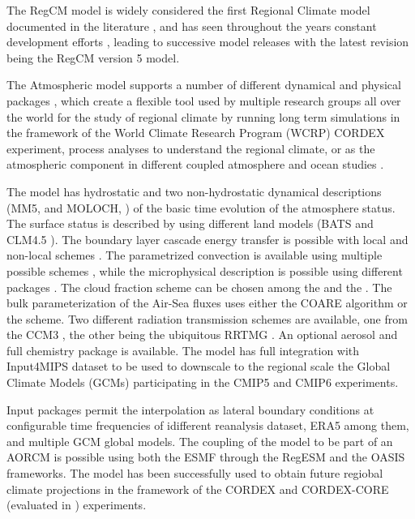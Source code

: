 \documentclass[journal abbreviation, manuscript]{copernicus}
\begin{document}
The RegCM model is widely considered the first Regional Climate model
documented in the literature \citep{giorgi-1989}, and has seen throughout
the years constant development efforts
\citep{giorgi-1993,giorgi-1999,pal-2007,giorgi-2012,coppola-2021,giorgi-2023},
leading to successive model releases with the latest revision being the
RegCM version 5 model.

The Atmospheric model supports a number of different dynamical and physical
packages \citep{giorgi-2023}, which create a flexible tool used by multiple
research groups all over the world for the study of regional climate by
running long term simulations in the framework of the World Climate
Research Program (WCRP) CORDEX experiment, process analyses to understand
the regional climate, or as the atmospheric component in different
coupled atmosphere and ocean studies
\citep{perrie-2001,ufuk-gmd-2013,wei-2014,ratnam-2009,sitz-2017,
       disante-2019,reale-2020,mishra-2021}.

The model has hydrostatic \citep{anthes-1987} and two non-hydrostatic dynamical
descriptions (MM5, \citet{grell-1994} and MOLOCH, \citet{davolio-2020}) of
the basic time evolution of the atmosphere status. The surface status is
described by using different land models (BATS \citet{dickinson-1993}
and CLM4.5 \citet{oleson-2013}).
The boundary layer cascade energy transfer is possible with local and
non-local schemes \citep{holtslag-1989,park-2009}.
The parametrized convection is available using multiple possible schemes
\citep{emanuel-1991,tiedtke-1989,kain-2004}, while the microphysical
description is possible using different packages
\citep{pal-2000,lim-2005,noto-gmd-2016}.
The cloud fraction scheme can be chosen among the \citet{sundqvist-1989}
and the \citet{xu-1996}.
The bulk parameterization of the Air-Sea fluxes uses either the COARE
\citep{fairall-2003} algorithm or the \citet{zeng-2005} scheme.
Two different radiation transmission schemes are available, one from the
CCM3 \citep{kiehl-1996}, the other being the ubiquitous RRTMG
\citep{mlawer-1997,iacono-2008}.
An optional aerosol \citep{zakey-2006,zakey-2008,solmon-2008} and
full chemistry package \citep{shalaby-2012} is available.
The model has full integration with Input4MIPS \citep{durack-2017}
dataset to be used to downscale to the regional scale the Global
Climate Models (GCMs) participating in the CMIP5 \citep{taylor-2012}
and CMIP6 \citep{eyring-2016} experiments.

Input packages permit the interpolation as lateral boundary conditions
at configurable time frequencies of idifferent reanalysis dataset, ERA5
\citep{hershbach-2020} among them, and multiple GCM global models.
The coupling of the model to be part of an AORCM is possible using both
the ESMF through the RegESM and the OASIS \citep{craig-2017} frameworks.
The model has been successfully used to obtain future regiobal climate
projections in the framework of the CORDEX \citep{gutowski-2016}
and CORDEX-CORE (evaluated in \citet{remedio-2019}) experiments.
\end{document}
